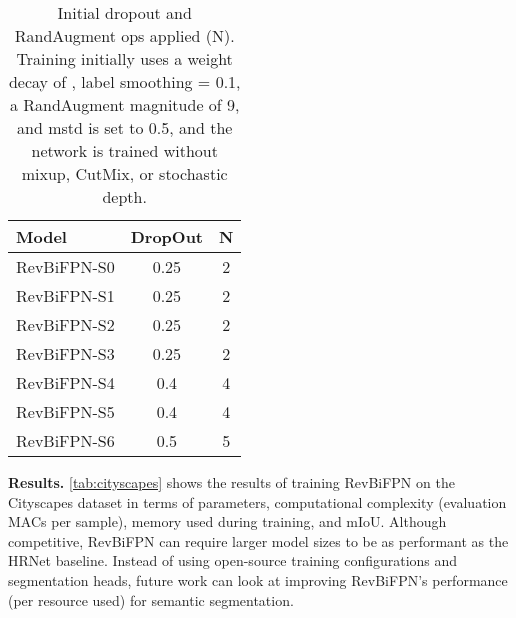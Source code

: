 \documentclass{article}
\begin{document}
\begin{table}
    \caption{
    Initial dropout and RandAugment ops applied (N).
    Training initially uses a weight decay of , label smoothing = 0.1, a RandAugment magnitude of 9, and mstd is set to 0.5, and the network is trained without mixup, CutMix, or stochastic depth.
    }
    \vskip 10pt
    \centering
    \small
    \sc
    \begin{tabular}{lcc}
        \toprule
        Model        & DropOut &  N \\ \midrule
        RevBiFPN-S0 & 0.25    &  2 \\
        RevBiFPN-S1 & 0.25    &  2 \\
        RevBiFPN-S2 & 0.25    &  2 \\
        RevBiFPN-S3 & 0.25    &  2 \\
        RevBiFPN-S4 & 0.4     &  4 \\
        RevBiFPN-S5 & 0.4     &  4 \\
        RevBiFPN-S6 & 0.5     &  5 \\
        \bottomrule
    \end{tabular}
    \vskip -10pt
    \label{tab:regularization-i}
\end{table}


\textbf{Results.}
\cref{tab:cityscapes} shows the results of training RevBiFPN on the Cityscapes dataset in terms of parameters, computational complexity (evaluation MACs per sample\footnotemark[5]), memory used during training, and mIoU.
Although competitive, RevBiFPN can require larger model sizes to be as performant as the HRNet baseline.
Instead of using open-source training configurations and segmentation heads, future work can look at improving RevBiFPN's performance (per resource used) for semantic segmentation.
\end{document}
